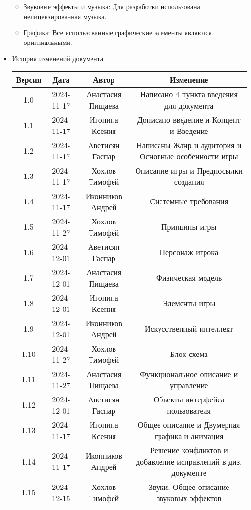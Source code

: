 \documentclass{article}
\begin{document}
\begin{itemize}
\begin{itemize}
\item Звуковые эффекты и музыка: Для разработки использована нелицензированная музыка.

\item Графика: Все использованные графические элементы являются оригинальными.
\end{itemize}

\item История изменений документа
\begin{center}
\begin{tabular}{| c | c | c | c |}
\hline
 Версия & Дата & Автор & Изменение \\  \hline
 1.0 & 2024-11-17 & Анастасия Пищаева & Написано 4 пункта введения для документа\\ \hline
 1.1 & 2024-11-17 & Игонина Ксения & Дописано введение и Концепт и Введение\\  \hline 
 1.2 & 2024-11-17 & Аветисян Гаспар & Написаны Жанр и аудитория и Основные особенности игры\\  \hline
 1.3 & 2024-11-17 & Хохлов Тимофей & Описание игры и Предпосылки создания\\  \hline
 1.4 & 2024-11-17 & Иконников Андрей & Системные требования\\ \hline 
 1.5 & 2024-11-27 & Хохлов Тимофей & Принципы игры\\  \hline
 1.6 & 2024-12-01 & Аветисян Гаспар & Персонаж игрока\\ \hline
 1.7 & 2024-12-01 & Анастасия Пищаева & Физическая модель\\ \hline
 1.8 & 2024-12-01 & Игонина Ксения & Элементы игры\\ \hline
 1.9 & 2024-12-01 & Иконников Андрей & Искусственный интеллект\\ \hline
 1.10 & 2024-11-27 & Хохлов Тимофей & Блок-схема\\  \hline
 1.11 & 2024-11-27 & Анастасия Пищаева & Функциональное описание и управление\\  \hline
 1.12 & 2024-12-01 & Аветисян Гаспар & Объекты интерфейса пользователя\\ \hline
 1.13 & 2024-11-17 & Игонина Ксения & Общее описание и Двумерная графика и анимация\\  \hline
 1.14 & 2024-11-17 & Иконников Андрей & Решение конфликтов и добавление исправлений в диз. документе\\  \hline
 1.15 & 2024-12-15 & Хохлов Тимофей & Звуки. Общее описание звуковых эффектов\\  \hline



\end{tabular}
\end{center}
\end{itemize}
\end{document}
